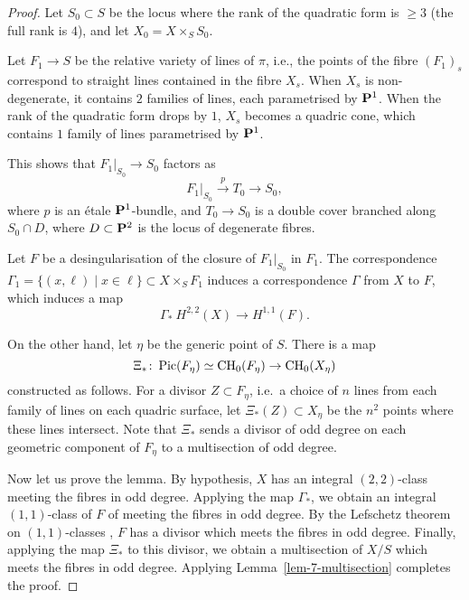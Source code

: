 \begin{proof}
    Let $S_0 \subset S$ be the locus where the rank of the quadratic form
    is $\geq 3$ (the full rank is $4$),
    and let $X_0 = X \times_S S_0$.

    Let $F_1 \to S$ be the relative variety of lines of $\pi$,
    i.e., the points of the fibre $(F_1)_s$ correspond to
    straight lines contained in the fibre $X_s$. 
    When $X_s$ is non-degenerate, it contains $2$ families of lines, each parametrised by $\bbP^1$.
    When the rank of the quadratic form drops by $1$, $X_s$ becomes a quadric cone,
    which contains $1$ family of lines parametrised by $\bbP^1$.
    
    This shows that $F_1 |_{S_0} \to S_0$ factors as
    \[ F_1 |_{S_0} \overset{p}{\longrightarrow} T_0 \longrightarrow S_0, \]
    where $p$ is an étale $\bbP^1$-bundle, 
    and $T_0 \to S_0$ is a double cover branched along $S_0 \cap D$,
    where $D \subset \bbP^2$ is the locus of degenerate fibres.

    Let $F$ be a desingularisation of the closure of $F_1 |_{S_0}$ in $F_1$.
    The correspondence $\Gamma_1 = \{ (x,\ell) \mid x \in \ell \} \subset X \times_S F_1$
    induces a correspondence $\Gamma$ from $X$ to $F$, 
    which induces a map 
    \[ \Gamma_* \: H^{2,2} (X) \to H^{1,1} (F). \]

    On the other hand, let $\eta$ be the generic point of $S$. There is a map
    \[ \Xi_* \colon \operatorname{Pic} (F_\eta) \simeq \mathrm{CH}_0 (F_\eta) \to \mathrm{CH}_0 (X_\eta) \]
    constructed as follows.
    For a divisor $Z \subset F_\eta$, i.e.\ a choice of $n$ lines
    from each family of lines on each quadric surface, let $\Xi_*(Z) \subset X_\eta$
    be the $n^2$ points where these lines intersect.
    Note that $\Xi_*$ sends a divisor of odd degree on each geometric component of $F_\eta$ to a multisection of odd degree.

    Now let us prove the lemma.
    By hypothesis, $X$ has an integral $(2,2)$-class meeting the fibres in odd degree.
    Applying the map $\Gamma_*$,
    we obtain an integral $(1,1)$-class of $F$ of meeting the fibres in odd degree.
    By the Lefschetz theorem on $(1,1)$-classes \cite[p.~163]{griffiths-harris},
    $F$ has a divisor which meets the fibres in odd degree.
    Finally, applying the map $\Xi_*$ to this divisor,
    we obtain a multisection of $X/S$ which meets the fibres in odd degree.
    Applying Lemma~\ref{lem-7-multisection} completes the proof.
\end{proof}

